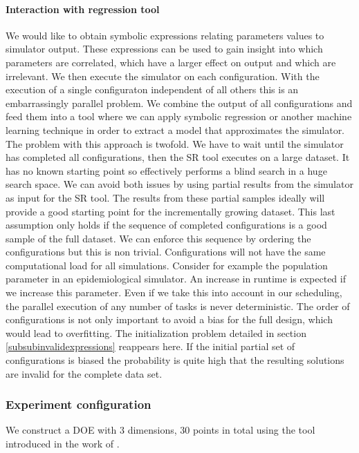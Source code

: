 \paragraph{Interaction with regression tool}
We would like to obtain symbolic expressions relating parameters values to simulator output. These expressions can be used to gain insight into which parameters are correlated, which have a larger effect on output and which are irrelevant. 
We then execute the simulator on each configuration. With the execution of a single configuraton independent of all others this is an embarrassingly parallel problem. We combine the output of all configurations and feed them into a tool where we can apply symbolic regression or another machine learning technique in order to extract a model that approximates the simulator. The problem with this approach is twofold. We have to wait until the simulator has completed all configurations, then the SR tool executes on a large dataset. It has no known starting point so effectively performs a blind search in a huge search space. We can avoid both issues by using partial results from the simulator as input for the SR tool. The results from these partial samples ideally will provide a good starting point for the incrementally growing dataset. This last assumption only holds if the sequence of completed configurations is a good sample of the full dataset. We can enforce this sequence by ordering the configurations but this is non trivial. Configurations will not have the same computational load for all simulations. Consider for example the population parameter in an epidemiological simulator. An increase in runtime is expected if we increase this parameter. Even if we take this into account in our scheduling, the parallel execution of any number of tasks is never deterministic. The order of configurations is not only important to avoid a bias for the full design, which would lead to overfitting. The initialization problem detailed in section \ref{subsubinvalidexpressions} reappears here. If the initial partial set of configurations is biased the probability is quite high that the resulting solutions are invalid for the complete data set. 

\subsubsection{Experiment configuration}
We construct a DOE with 3 dimensions, 30 points in total using the tool introduced in the work of \citep{DOE}. 

